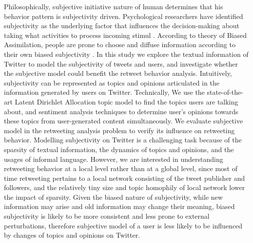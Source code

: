\documentclass{acm_proc_article-sp}
\begin{document}
Philosophically, subjective initiative nature of human determines that his behavior pattern is subjectivity driven.
Psychological researchers have identified subjectivity as the underlying factor that influences the decision-making about taking what activities to process incoming stimul \cite{Moore2008}.
According to theory of Biased Assimilation, people are prone to choose and diffuse information according to their own biased subjectivity \cite{Hyman2000,sunstein2009rumors}. 
In this study we explore the textual information of Twitter to model the subjectivity of tweets and users, and investigate whether the subjective model could benefit the retweet behavior analysis. 
Intuitively, subjectivity can be represented as topics and opinions articulated in the information generated by users on Twitter.
Technically, We use the state-of-the-art Latent Dirichlet Allocation topic model to find the topics users are talking about, and sentiment analysis techniques to determine user’s opinions towards these topics from user-generated content simultaneously. 
We evaluate subjective model in the retweeting analysis problem to verify its influence on retweeting behavior.
Modelling subjectivity on Twitter is a challenging task because of the sparsity of textual information, the dynamics of topics and opinions, and the usages of informal language.
However, we are interested in understanding retweeting behavior at a local level rather than at a global level, since most of time retweeting pertains to a local network consisting of the tweet publisher and followers, and the relatively tiny size and topic homophily of local network lower the impact of sparsity.
Given the biased nature of subjectivity, while new information may arise and old information may change their meaning, biased subjectivity is likely to be more consistent and less prone to external perturbations, therefore subjective model of a user is less likely to be influenced by changes of topics and opinions on Twitter.
 
\end{document}
